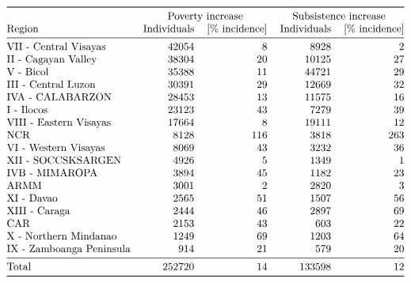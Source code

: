 \documentclass[10pt]{article}
\begin{document}
\[\begin{tabular}{@{}lrrrr@{}}
\toprule
{} &  \multicolumn{2}{c}{Poverty increase} &  \multicolumn{2}{c}{Subsistence increase}\\
Region                   & Individuals & [\% incidence] & Individuals & [\% incidence]  \\
\midrule
VII - Central Visayas    &    42054 &                 8 &     8928 &                 2 \\
II - Cagayan Valley      &    38304 &                20 &    10125 &                27 \\
V - Bicol                &    35388 &                11 &    44721 &                29 \\
III - Central Luzon      &    30391 &                29 &    12669 &                32 \\
IVA - CALABARZON         &    28453 &                13 &    11575 &                16 \\
I - Ilocos               &    23123 &                43 &     7279 &                39 \\
VIII - Eastern Visayas   &    17664 &                 8 &    19111 &                12 \\
NCR                      &     8128 &               116 &     3818 &               263 \\
VI - Western Visayas     &     8069 &                43 &     3232 &                36 \\
XII - SOCCSKSARGEN       &     4926 &                 5 &     1349 &                 1 \\
IVB - MIMAROPA           &     3894 &                45 &     1182 &                23 \\
ARMM                     &     3001 &                 2 &     2820 &                 3 \\
XI - Davao               &     2565 &                51 &     1507 &                56 \\
XIII - Caraga            &     2444 &                46 &     2897 &                69 \\
CAR                      &     2153 &                43 &      603 &                22 \\
X - Northern Mindanao    &     1249 &                69 &     1203 &                64 \\
IX - Zamboanga Peninsula &      914 &                21 &      579 &                20 \\
\midrule
Total                    &   252720 &                14 &   133598 &                12 \\
\bottomrule
\end{tabular}\]
\end{document}
